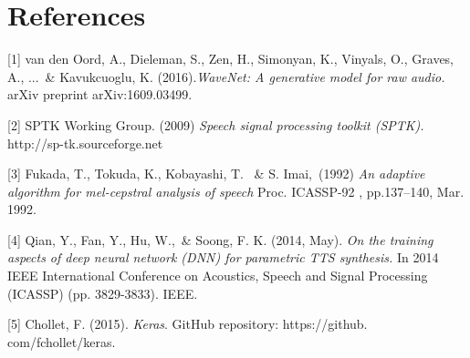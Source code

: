 \section*{References}



\small


\label{ref_1}[1] van den Oord, A., Dieleman, S., Zen, H., Simonyan, K., Vinyals, O., Graves, A., ...\ \& Kavukcuoglu, K. (2016).{\it WaveNet: A generative model for raw audio.} arXiv preprint arXiv:1609.03499.

\label{ref_2}[2] SPTK Working Group. (2009) {\it Speech signal processing toolkit (SPTK).} http://sp-tk.sourceforge.net

\label{ref_3}[3] Fukada, T., Tokuda, K., Kobayashi, T. \ \& S. Imai,\ (1992) {\it An adaptive algorithm for mel-cepstral 
analysis of speech} Proc. ICASSP-92 , pp.137–140, Mar. 1992.

\label{ref_4}[4] Qian, Y., Fan, Y., Hu, W.,\ \& Soong, F. K. (2014, May). {\it On the training aspects of deep neural network (DNN) for parametric TTS synthesis.} In 2014 IEEE International Conference on Acoustics, Speech and Signal Processing (ICASSP) (pp. 3829-3833). IEEE.

\label{ref_5}[5] Chollet, F. (2015). {\it Keras}. GitHub repository: https://github. com/fchollet/keras.